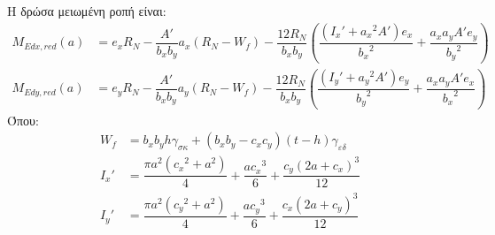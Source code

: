 Η δρώσα μειωμένη ροπή είναι:
\begin{subequations}
\begin{align}
  M_{Edx,red}\left(a\right) & = e_x R_N - \dfrac{A'}{b_x b_y}a_x\left(R_N - W_f\right) - \dfrac{12R_N}{b_x b_y}\left(\dfrac{\left(I_x ' + {a_x}^2 A'\right)e_x}{{b_x}^2} + \dfrac{a_x a_y A' e_y}{{b_y}^2}\right)\label{eqn:215a}\\[5pt]
  M_{Edy,red}\left(a\right) & = e_y R_N - \dfrac{A'}{b_x b_y}a_y\left(R_N - W_f\right) - \dfrac{12R_N}{b_x b_y}\left(\dfrac{\left(I_y ' + {a_y}^2 A'\right)e_y}{{b_y}^2} + \dfrac{a_x a_y A' e_x}{{b_x}^2}\right)\label{eqn:215b}
\end{align}
\end{subequations}
Όπου:
\begin{subequations}
\begin{align}
  W_f & = b_x b_y h {\gamma}_{\sigma\kappa} + \left(b_x b_y - c_x c_y \right)\left(t - h\right){\gamma}_{\varepsilon\delta}\label{eqn:216a}\\[5pt]
  I_x ' & = \dfrac{\pi a^2 \left({c_x}^2 + a^2\right)}{4} + \dfrac{a{c_x}^3}{6} + \dfrac{{c_y} \left(2a + c_x\right)^3}{12}\label{eqn:216b}\\[5pt]
  I_y ' & = \dfrac{\pi a^2 \left({c_y}^2 + a^2\right)}{4} + \dfrac{a{c_y}^3}{6} + \dfrac{{c_x} \left(2a + c_y\right)^3}{12}\label{eqn:216c}
\end{align}
\end{subequations}

